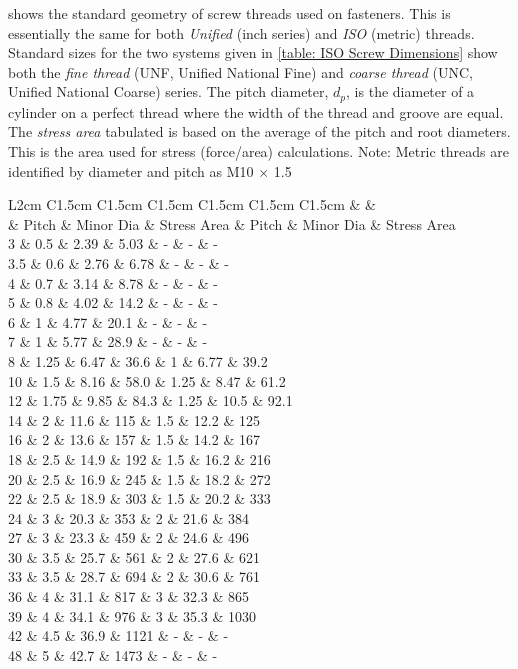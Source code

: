 \documentclass[a4paper,openany,nobib]{tufte-book}
\begin{document}
{{shows the standard geometry of screw threads used on fasteners. This is
essentially the same for both \emph{Unified} (inch series) and \emph{ISO} (metric)
threads. Standard sizes for the two systems given in
\ref{table: ISO Screw Dimensions} show
both the \emph{fine thread} (UNF, Unified National Fine) and \emph{coarse thread}
(UNC, Unified National Coarse) series. The pitch diameter, \(d_p\), is the
diameter of a cylinder on a perfect thread where the width of the thread
and groove are equal. The \emph{stress area} tabulated is based on the
average of the pitch and root diameters. This is the area used for
stress (force/area) calculations. Note: Metric threads are identified by
diameter and pitch as M10 \(\times\) 1.5


 L2cm C1.5cm C1.5cm C1.5cm C1.5cm C1.5cm C1.5cm \& \&\\
\& Pitch \& Minor Dia \& Stress Area \& Pitch \& Minor Dia \& Stress Area\\
3 \& 0.5 \& 2.39 \& 5.03 \& - \& - \& -\\
3.5 \& 0.6 \& 2.76 \& 6.78 \& - \& - \& -\\
4 \& 0.7 \& 3.14 \& 8.78 \& - \& - \& -\\
5 \& 0.8 \& 4.02 \& 14.2 \& - \& - \& -\\
6 \& 1 \& 4.77 \& 20.1 \& - \& - \& -\\
7 \& 1 \& 5.77 \& 28.9 \& - \& - \& -\\
8 \& 1.25 \& 6.47 \& 36.6 \& 1 \& 6.77 \& 39.2\\
10 \& 1.5 \& 8.16 \& 58.0 \& 1.25 \& 8.47 \& 61.2\\
12 \& 1.75 \& 9.85 \& 84.3 \& 1.25 \& 10.5 \& 92.1\\
14 \& 2 \& 11.6 \& 115 \& 1.5 \& 12.2 \& 125\\
16 \& 2 \& 13.6 \& 157 \& 1.5 \& 14.2 \& 167\\
18 \& 2.5 \& 14.9 \& 192 \& 1.5 \& 16.2 \& 216\\
20 \& 2.5 \& 16.9 \& 245 \& 1.5 \& 18.2 \& 272\\
22 \& 2.5 \& 18.9 \& 303 \& 1.5 \& 20.2 \& 333\\
24 \& 3 \& 20.3 \& 353 \& 2 \& 21.6 \& 384\\
27 \& 3 \& 23.3 \& 459 \& 2 \& 24.6 \& 496\\
30 \& 3.5 \& 25.7 \& 561 \& 2 \& 27.6 \& 621\\
33 \& 3.5 \& 28.7 \& 694 \& 2 \& 30.6 \& 761\\
36 \& 4 \& 31.1 \& 817 \& 3 \& 32.3 \& 865\\
39 \& 4 \& 34.1 \& 976 \& 3 \& 35.3 \& 1030\\
42 \& 4.5 \& 36.9 \& 1121 \& - \& - \& -\\
48 \& 5 \& 42.7 \& 1473 \& - \& - \& -\\

}}
\end{document}
